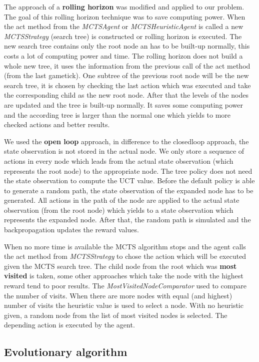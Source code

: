 The approach of a \textbf{rolling horizon} was modified and applied to our problem. The goal of this rolling horizon technique was to save computing power. 
When the act method from the \textit{MCTSAgent} or \textit{MCTSHeuristicAgent} is called a new \textit{MCTSStrategy} (search tree) is constructed or rolling horizon is executed. The new search tree contains only the root node an has to be built-up normally, this costs a lot of computing power and time. The rolling horizon does not build a whole new tree, it uses the information from the previous call of the act method (from the last gametick). 
One subtree of the previous root node will be the new search tree, it is chosen by checking the last action which was executed and take the corresponding child as the new root node.
After that the levels of the nodes are updated and the tree is built-up normally. It saves some computing power and the according tree is larger than the normal one which yields to more checked actions and better results.  

We used the \textbf{open loop} approach, in difference to the closedloop approach, the state observation is not stored in the actual node. We only store a sequence of actions in every node which leads from the actual state observation (which represents the root node) to the appropriate node. The tree policy does not need the state observation to compute the \ac{UCT} value. 
Before the default policy is able to generate a random path, the state observation of the expanded node has to be generated. All actions in the path of the node are applied to the actual state observation (from the root node) which yields to a state observation which represents the expanded node. After that, the random path is simulated and the backpropagation updates the reward values.


When no more time is available the \ac{MCTS} algorithm stops and the agent calls the act method from \textit{MCTSStrategy} to chose the action which will be executed given the \ac{MCTS} search tree. The child node from the root which was \textbf{most visited} is taken, some other approaches which take the node with the highest reward tend to poor results. The \textit{MostVisitedNodeComparator} used to compare the number of visits. When there are more nodes with equal (and highest) number of visits the heuristic value is used to select a node. With no heuristic given, a random node from the list of most visited nodes is selected. The depending action is executed by the agent. 


\subsection{Evolutionary algorithm} 

